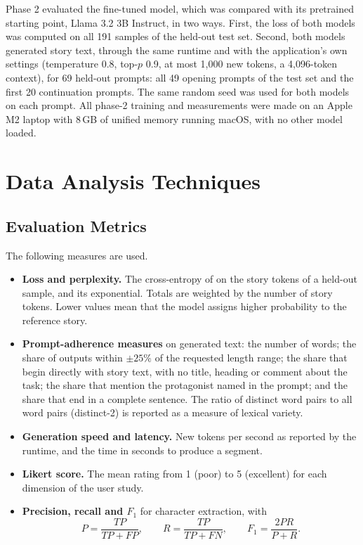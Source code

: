 Phase 2 evaluated the fine-tuned model, which was compared with its pretrained starting point, Llama 3.2 3B Instruct, in two ways. First, the loss of both models was computed on all 191 samples of the held-out test set. Second, both models generated story text, through the same runtime and with the application's own settings (temperature 0.8, top-$p$ 0.9, at most 1,000 new tokens, a 4,096-token context), for 69 held-out prompts: all 49 opening prompts of the test set and the first 20 continuation prompts. The same random seed was used for both models on each prompt. All phase-2 training and measurements were made on an Apple M2 laptop with 8\,GB of unified memory running macOS, with no other model loaded.

\section{Data Analysis Techniques}
\label{sec:model-analysis}

\subsection{Evaluation Metrics}

The following measures are used.

\begin{itemize}
    \item \textbf{Loss and perplexity.} The cross-entropy of  on the story tokens of a held-out sample, and its exponential. Totals are weighted by the number of story tokens. Lower values mean that the model assigns higher probability to the reference story.
    \item \textbf{Prompt-adherence measures} on generated text: the number of words; the share of outputs within $\pm 25\%$ of the requested length range; the share that begin directly with story text, with no title, heading or comment about the task; the share that mention the protagonist named in the prompt; and the share that end in a complete sentence. The ratio of distinct word pairs to all word pairs (distinct-2) is reported as a measure of lexical variety.
    \item \textbf{Generation speed and latency.} New tokens per second as reported by the runtime, and the time in seconds to produce a segment.
    \item \textbf{Likert score.} The mean rating from 1 (poor) to 5 (excellent) for each dimension of the user study.
    \item \textbf{Precision, recall and $F_1$} for character extraction, with
    \begin{equation}
    P = \frac{TP}{TP+FP}, \qquad R = \frac{TP}{TP+FN}, \qquad F_1 = \frac{2PR}{P+R}.
    \end{equation}
\end{itemize}

